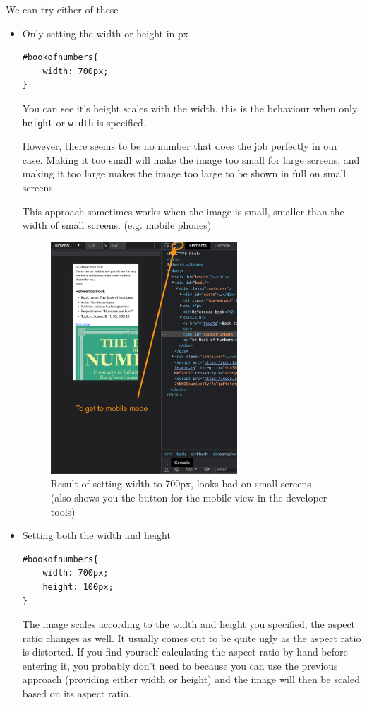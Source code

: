 We can try either of these

\begin{itemize}
\item Only setting the width or height in px
    
\begin{lstlisting}[language=pug]
#bookofnumbers{
    width: 700px;
}
\end{lstlisting}

You can see it's height scales with the width, this is the behaviour when only \texttt{height} or \texttt{width} is specified.

However, there seems to be no number that does the job perfectly in our case. Making it too small will make the image too small for large screens, and making it too large makes the image too large to be shown in full on small screens. 

This approach sometimes works when the image is small, smaller than the width of small screens. (e.g. mobile phones)

\begin{figure}[h]
\centering
\includegraphics[width=7cm]{images/chn6-widthonly.png}
\caption{Result of setting width to 700px, looks bad on small screens (also shows you the button for the mobile view in the developer tools)}
\end{figure}

\item Setting both the width and height

\begin{lstlisting}[language=pug]
#bookofnumbers{
    width: 700px;
    height: 100px;
}
\end{lstlisting}

The image scales according to the width and height you specified, the aspect ratio changes as well. It usually comes out to be quite ugly as the aspect ratio is distorted. If you find yourself calculating the aspect ratio by hand before entering it, you probably don't need to because you can use the previous approach (providing either width or height) and the image will then be scaled based on its aspect ratio.


\end{itemize}
